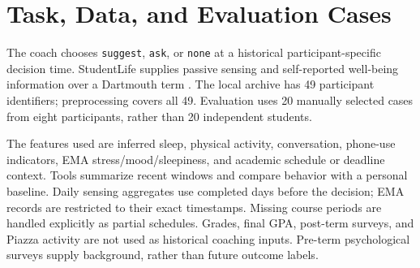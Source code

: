 \documentclass{article}
\begin{document}
\printAffiliationsAndNotice{\icmlEqualContribution}
\begin{abstract}
We evaluate a training-free student stress coach that combines planning, tool use, multi-agent interaction, reflection, and persistent memory with modular coaching skills. A corrected experiment uses the same 20 historical decision cases across nine configurations, with one fixed model per condition and a separate OpenAI judge. The full system completes all cases and matches all hand-authored allowed decisions. Its 16 non-null messages receive a mean quality score of 4.81/5. One human independently rates 10 messages before automated judging; the mean absolute difference across 30 criterion ratings is 0.267 points. We report the required structural, depth, and model comparisons, including matched-message quality, efficiency, and measurement limitations. These small, selected-case results measure software behavior; they do not establish student well-being benefits or population-level superiority.
\end{abstract}

\section{Task, Data, and Evaluation Cases}
The coach chooses \texttt{suggest}, \texttt{ask}, or \texttt{none} at a historical participant-specific decision time. StudentLife supplies passive sensing and self-reported well-being information over a Dartmouth term \cite{wang2014studentlife}. The local archive has 49 participant identifiers; preprocessing covers all 49. Evaluation uses 20 manually selected cases from eight participants, rather than 20 independent students.

The features used are inferred sleep, physical activity, conversation, phone-use indicators, EMA stress/mood/sleepiness, and academic schedule or deadline context. Tools summarize recent windows and compare behavior with a personal baseline. Daily sensing aggregates use completed days before the decision; EMA records are restricted to their exact timestamps. Missing course periods are handled explicitly as partial schedules. Grades, final GPA, post-term surveys, and Piazza activity are not used as historical coaching inputs. Pre-term psychological surveys supply background, rather than future outcome labels.
\end{document}
